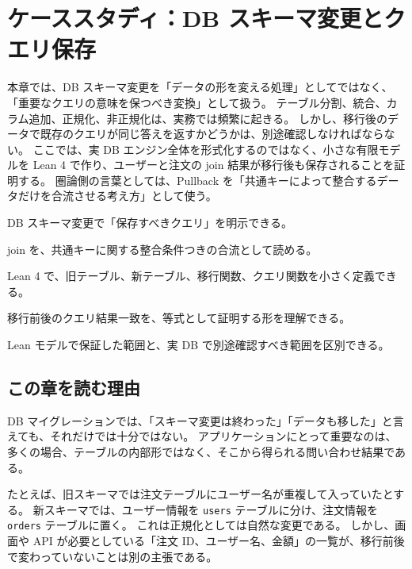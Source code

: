 \chapter{ケーススタディ：DB スキーマ変更とクエリ保存}
\label{chap:db-schema-query-preservation}

\begin{chapterabstract}
本章では、DB スキーマ変更を「データの形を変える処理」としてではなく、「重要なクエリの意味を保つべき変換」として扱う。
テーブル分割、統合、カラム追加、正規化、非正規化は、実務では頻繁に起きる。
しかし、移行後のデータで既存のクエリが同じ答えを返すかどうかは、別途確認しなければならない。
ここでは、実 DB エンジン全体を形式化するのではなく、小さな有限モデルを Lean 4 で作り、ユーザーと注文の join 結果が移行後も保存されることを証明する。
圏論側の言葉としては、Pullback を「共通キーによって整合するデータだけを合流させる考え方」として使う。
\end{chapterabstract}

\begin{learninggoals}
\item DB スキーマ変更で「保存すべきクエリ」を明示できる。
\item join を、共通キーに関する整合条件つきの合流として読める。
\item Lean 4 で、旧テーブル、新テーブル、移行関数、クエリ関数を小さく定義できる。
\item 移行前後のクエリ結果一致を、等式として証明する形を理解できる。
\item Lean モデルで保証した範囲と、実 DB で別途確認すべき範囲を区別できる。
\end{learninggoals}

\section{この章を読む理由}

DB マイグレーションでは、「スキーマ変更は終わった」「データも移した」と言えても、それだけでは十分ではない。
アプリケーションにとって重要なのは、多くの場合、テーブルの内部形ではなく、そこから得られる問い合わせ結果である。

たとえば、旧スキーマでは注文テーブルにユーザー名が重複して入っていたとする。
新スキーマでは、ユーザー情報を \texttt{users} テーブルに分け、注文情報を \texttt{orders} テーブルに置く。
これは正規化としては自然な変更である。
しかし、画面や API が必要としている「注文 ID、ユーザー名、金額」の一覧が、移行前後で変わっていないことは別の主張である。

